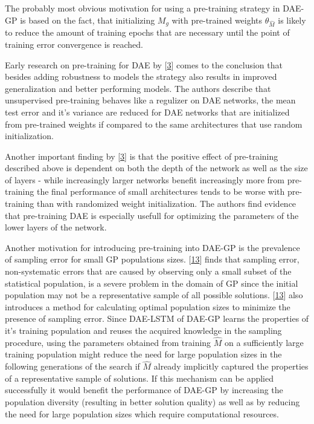 \documentclass[
  11pt,
]{article}
\begin{document}
The probably most obvious motivation for using a pre-training strategy
in DAE-GP is based on the fact, that initializing \(M_g\) with
pre-trained weights \(\theta_{\hat{M}}\) is likely to reduce the amount
of training epochs that are necessary until the point of training error
convergence is reached.

Early research on pre-training for DAE by
{[}\protect\hyperlink{ref-pmlr-v5-erhan09a}{3}{]} comes to the
conclusion that besides adding robustness to models the strategy also
results in improved generalization and better performing models. The
authors describe that unsupervised pre-training behaves like a regulizer
on DAE networks, the mean test error and it's variance are reduced for
DAE networks that are initialized from pre-trained weights if compared
to the same architectures that use random initialization.

Another important finding by
{[}\protect\hyperlink{ref-pmlr-v5-erhan09a}{3}{]} is that the positive
effect of pre-training described above is dependent on both the depth of
the network as well as the size of layers - while increasingly larger
networks benefit increasingly more from pre-training the final
performance of small architectures tends to be worse with pre-training
than with randomized weight initialization. The authors find evidence
that pre-training DAE is especially usefull for optimizing the
parameters of the lower layers of the network.

Another motivation for introducing pre-training into DAE-GP is the
prevalence of sampling error for small GP populations sizes.
{[}\protect\hyperlink{ref-sampling_err_gp}{13}{]} finds that sampling
error, non-systematic errors that are caused by observing only a small
subset of the statistical population, is a severe problem in the domain
of GP since the initial population may not be a representative sample of
all possible solutions.
{[}\protect\hyperlink{ref-sampling_err_gp}{13}{]} also introduces a
method for calculating optimal population sizes to minimize the presence
of sampling error. Since DAE-LSTM of DAE-GP learns the properties of
it's training population and reuses the acquired knowledge in the
sampling procedure, using the parameters obtained from training
\(\hat{M}\) on a sufficiently large training population might reduce the
need for large population sizes in the following generations of the
search if \(\hat{M}\) already implicitly captured the properties of a
representative sample of solutions. If this mechanism can be applied
successfully it would benefit the performance of DAE-GP by increasing
the population diversity (resulting in better solution quality) as well
as by reducing the need for large population sizes which require
computational resources.
\end{document}
